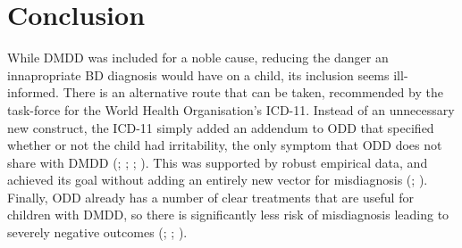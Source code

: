 \documentclass[stu,a4paper,12pt,donotrepeattitle]{apa7}
\begin{document}
\section{Conclusion}
While DMDD was included for a noble cause, reducing the danger an innapropriate
BD diagnosis would have on a child, its inclusion seems ill-informed. There is
an alternative route that can be taken, recommended by the task-force for the
World Health Organisation's ICD-11. Instead of an unnecessary new construct,
the ICD-11 simply added an addendum to ODD that specified whether or not the
child had irritability, the only symptom that ODD does not share with DMDD
(\cite{lochman15}; \cite{mahbell19}; \cite{mayetal16}; \cite{mayetal19}). This
was supported by robust empirical data, and achieved its goal without adding
an entirely new vector for misdiagnosis (\cite{mayetal16}; \cite{mayetal19}).
Finally, ODD already has a number of clear treatments that are useful for
children with DMDD, so there is significantly less risk of misdiagnosis leading
to severely negative outcomes (\cite{lochman15}; \cite{mayetal16}; \cite{mayetal19}).
\newpage
\printbibliography
\end{document}
